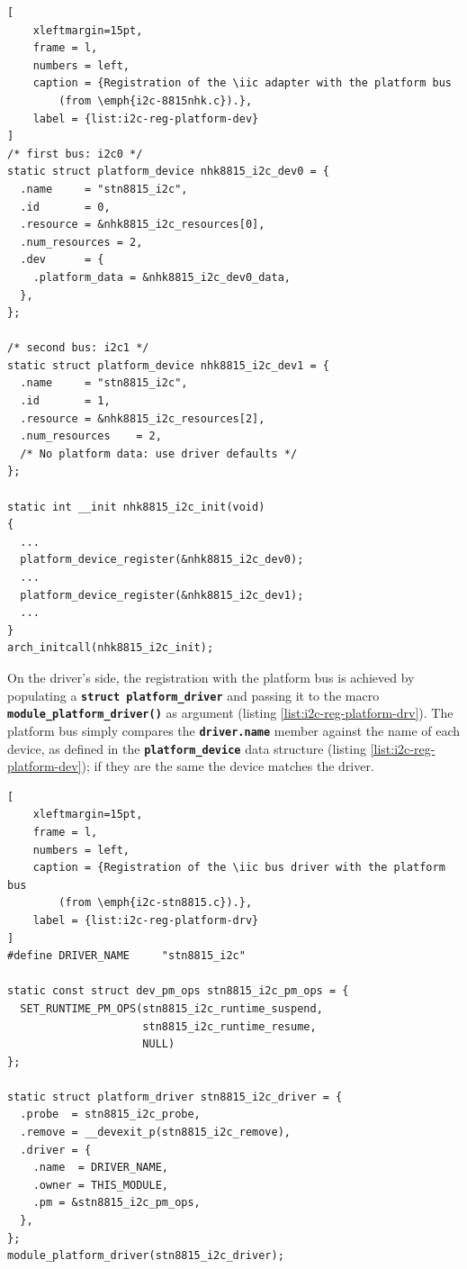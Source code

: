 \documentclass[a4paper,10pt]{article}
\newcommand{\iic}{I\textsuperscript{2}C }
\newcommand{\keyword}[1]{\texttt{\textbf{#1}}}
\begin{document}
\begin{multicols}{2}
\begin{lstlisting}[
	xleftmargin=15pt,
	frame = l,
	numbers = left,
	caption = {Registration of the \iic adapter with the platform bus
		(from \emph{i2c-8815nhk.c}).},
	label = {list:i2c-reg-platform-dev}
]
/* first bus: i2c0 */
static struct platform_device nhk8815_i2c_dev0 = {
  .name		= "stn8815_i2c",
  .id		= 0,
  .resource	= &nhk8815_i2c_resources[0],
  .num_resources = 2,
  .dev		= {
    .platform_data = &nhk8815_i2c_dev0_data,
  },
};

/* second bus: i2c1 */
static struct platform_device nhk8815_i2c_dev1 = {
  .name		= "stn8815_i2c",
  .id		= 1,
  .resource	= &nhk8815_i2c_resources[2],
  .num_resources	= 2,
  /* No platform data: use driver defaults */
};

static int __init nhk8815_i2c_init(void)
{
  ...
  platform_device_register(&nhk8815_i2c_dev0);
  ...
  platform_device_register(&nhk8815_i2c_dev1);
  ...
}
arch_initcall(nhk8815_i2c_init);
\end{lstlisting}

On the driver's side, the registration with the platform bus is achieved by
populating a \keyword{struct  platform\_driver} and passing it to the
macro \keyword{module\_platform\_driver()} as argument (listing
\ref{list:i2c-reg-platform-drv}).
The platform bus simply compares the \keyword{driver.name} member against
the name of each device, as defined in the \keyword{platform\_device} data
structure (listing \ref{list:i2c-reg-platform-dev}); if they are the same
the device matches the driver.

\begin{lstlisting}[
	xleftmargin=15pt,
	frame = l,
	numbers = left,
	caption = {Registration of the \iic bus driver with the platform bus
		(from \emph{i2c-stn8815.c}).},
	label = {list:i2c-reg-platform-drv}
]
#define DRIVER_NAME 	"stn8815_i2c"

static const struct dev_pm_ops stn8815_i2c_pm_ops = {
  SET_RUNTIME_PM_OPS(stn8815_i2c_runtime_suspend,
                     stn8815_i2c_runtime_resume,
                     NULL)
};

static struct platform_driver stn8815_i2c_driver = {
  .probe  = stn8815_i2c_probe,
  .remove = __devexit_p(stn8815_i2c_remove),
  .driver = {
    .name  = DRIVER_NAME,
    .owner = THIS_MODULE,
    .pm	= &stn8815_i2c_pm_ops,
  },
};
module_platform_driver(stn8815_i2c_driver);
\end{lstlisting}


\end{multicols}
\end{document}
